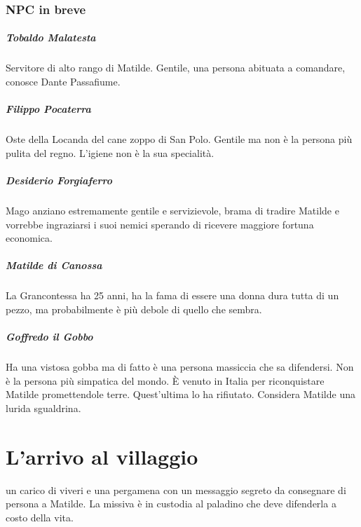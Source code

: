 \documentclass[letterpaper,twocolumn,openany,nodeprecatedcode]{dndbook}
\begin{document}
\subsection{NPC in breve}

\paragraph{Tobaldo Malatesta} Servitore di alto rango di Matilde. Gentile, una persona abituata a comandare, conosce Dante Passafiume.

\paragraph{Filippo Pocaterra} Oste della Locanda del cane zoppo di San Polo. Gentile ma non è la persona più pulita del regno. L'igiene non è la sua specialità.

\paragraph{Desiderio Forgiaferro} Mago anziano estremamente gentile e servizievole, brama di tradire Matilde e vorrebbe ingraziarsi i suoi nemici sperando di ricevere maggiore fortuna economica.

\paragraph{Matilde di Canossa} La Grancontessa ha 25 anni, ha la fama di essere una donna dura tutta di un pezzo, ma probabilmente è più debole di quello che sembra.

\paragraph{Goffredo il Gobbo} Ha una vistosa gobba ma di fatto è una persona massiccia che sa difendersi. Non è la persona più simpatica del mondo. È venuto in Italia per riconquistare Matilde promettendole terre. Quest'ultima lo ha rifiutato. Considera Matilde una lurida sgualdrina.


\chapter{L'arrivo al villaggio}
 un carico di viveri e una pergamena con un messaggio segreto da consegnare di persona a Matilde. La miss\cite{wiki:matilde}iva è in custodia al paladino che deve difenderla a costo della vita.
\end{document}
